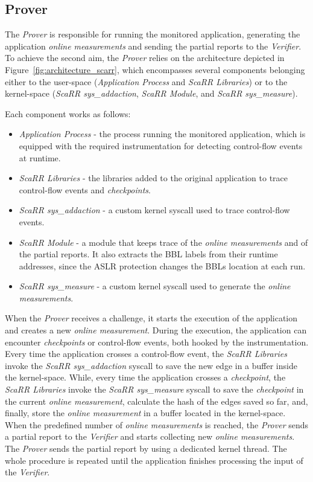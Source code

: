 \subsection{Prover}
\label{ssec:prover}
The \emph{Prover} is responsible for running the monitored application, 
generating the application \emph{online measurements} and sending the partial 
reports to the \emph{Verifier}. 
To achieve the second aim, the \emph{Prover} relies on the architecture 
depicted in Figure~\ref{fig:architecture_scarr}, which encompasses several 
components 
belonging either to the user-space (\ie \emph{Application Process} and 
\emph{ScaRR Libraries}) or to the kernel-space (\ie \emph{ScaRR 
sys\_addaction}, \emph{ScaRR Module}, and \emph{ScaRR sys\_measure}). 

Each component works as follows:  
\begin{itemize}
	\item \emph{Application Process} - the process running the monitored 
	application, which is equipped with the required instrumentation for 
	detecting control-flow events at runtime.
	\item \emph{ScaRR Libraries} - the libraries added to the original 
	application to trace control-flow events and \emph{checkpoints}.
	\item \emph{ScaRR sys\_addaction} - a custom kernel syscall used to trace 
	control-flow events.
	\item \emph{ScaRR Module} - a module that keeps trace of the \emph{online 
	measurements} and of the partial reports. It also extracts the BBL labels 
	from their runtime addresses, since the ASLR protection changes the BBLs 
	location at each run.
	\item \emph{ScaRR sys\_measure} - a custom kernel syscall used to generate 
	the \emph{online measurements}. 
\end{itemize}
When the \emph{Prover} receives a challenge, it starts the execution of the 
application and creates a new \emph{online measurement}.
During the execution, the application can encounter \emph{checkpoints} or 
control-flow events, both hooked by the instrumentation.
Every time the application crosses a control-flow event, the \emph{ScaRR 
Libraries}
invoke the \emph{ScaRR sys\_addaction} syscall to save the new edge in a buffer 
inside the kernel-space.
While, every time the application crosses a \emph{checkpoint}, the \emph{ScaRR 
Libraries}
invoke the \emph{ScaRR sys\_measure} syscall to save the \emph{checkpoint}
in the current \emph{online measurement}, calculate the hash of the edges saved 
so far, and,
finally, store the \emph{online measurement} in a buffer located in the 
kernel-space.
When the predefined number of \emph{online measurements} is reached, 
the \emph{Prover} sends a partial report to the \emph{Verifier} and starts 
collecting new \emph{online measurements}.
The \emph{Prover} sends the partial report by using a dedicated kernel thread.
The whole procedure is repeated until the application finishes processing the 
input of the \emph{Verifier}. 


